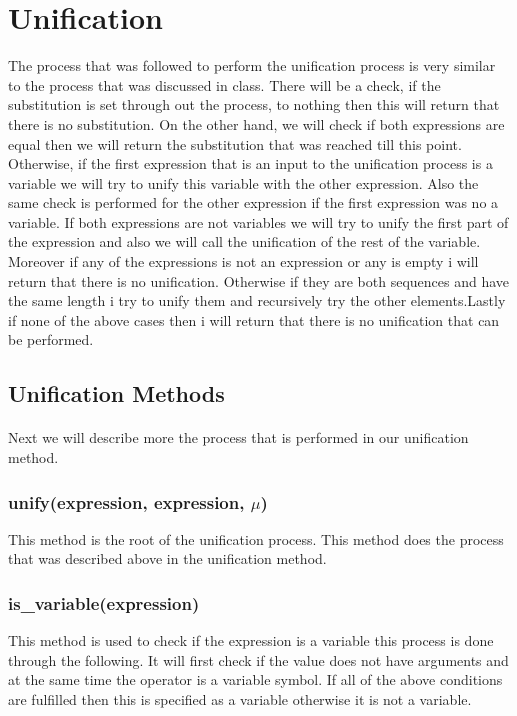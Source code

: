 \label{chap:assign1}{


\section{Unification}\label{unificationMethod}

	The process that was followed to perform the unification process is very similar to the process that was discussed in class. There will be a check, if the substitution is set through out the process, to nothing then this will return that there is no substitution. On the other hand, we will check if both expressions are equal then we will return the substitution that was reached till this point. Otherwise, if the first expression that is an input to the unification process is a variable we will try to unify this variable with the other expression. Also the same check is performed for the other expression if the first expression was no a variable. If both expressions are not variables we will try to unify the first part of the expression and also we will call the unification of the rest of the variable. Moreover if any of the expressions is not an expression or any is empty i will return that there is no unification. Otherwise if they are both sequences and have the same length i try to unify them and recursively try the other elements.Lastly if none of the above cases then i will return that there is no unification that can be performed.
	

\subsection{Unification Methods}
\paragraph*{}
Next we will describe more the process that is performed in our unification method.

\subsubsection{unify(expression, expression, $\mu$)}
This method is the root of the unification process. This method does the process that was described above in the unification method.

\subsubsection{is\_variable(expression)}
This method is used to check if the expression is a variable this process is done through the following. It will first check if the value does not have arguments and at the same time the operator is a variable symbol. If all of the above conditions are fulfilled then this is specified as a variable otherwise it is not a variable.

}
